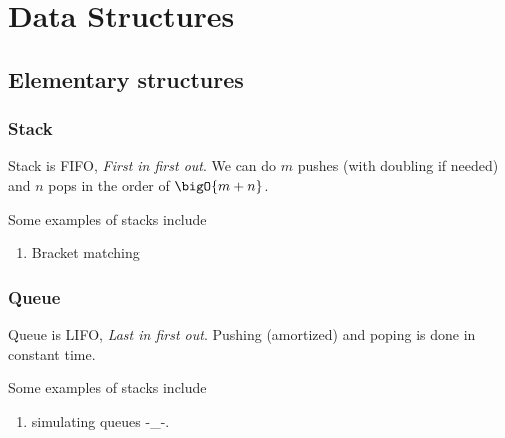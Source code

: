 \chapter{Data Structures}
\section{Elementary structures}
\subsection{Stack}
Stack is FIFO, \textit{First in first out}. We can do \(m\) pushes (with doubling if needed) and \(n\) pops in the order of \(\bigO{m + n}\).
\begin{example}
    Some examples of stacks include
    \begin{enumerate}
        \item Bracket matching
    \end{enumerate}
\end{example}

\subsection{Queue}
Queue is LIFO, \textit{Last in first out}.
Pushing (amortized) and poping is done in constant time.
\begin{example}
    Some examples of stacks include
    \begin{enumerate}
        \item simulating queues -\_-.
    \end{enumerate}
\end{example}
